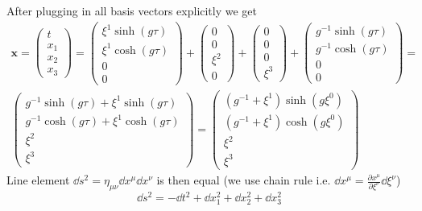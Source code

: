 After plugging in all basis vectors explicitly we get
%
\begin{multline}
	\boldsymbol{x} =
	\begin{pmatrix}
		t   \\
		x_1 \\
		x_2 \\
		x_3
	\end{pmatrix}
	=
	\begin{pmatrix}
		\xi^1 \sinh(g\tau) \\
		\xi^1 \cosh(g\tau) \\
		0                  \\
		0
	\end{pmatrix}+
	\begin{pmatrix}
		0     \\
		0     \\
		\xi^2 \\
		0
	\end{pmatrix}+
	\begin{pmatrix}
		0 \\
		0 \\
		0 \\
		\xi^3
	\end{pmatrix}+
	\begin{pmatrix}
		g^{-1}\sinh(g\tau) \\
		g^{-1}\cosh(g\tau) \\
		0                  \\
		0
	\end{pmatrix}= \\
	\begin{pmatrix}
		g^{-1}\sinh(g\tau) + \xi^1 \sinh(g\tau) \\
		g^{-1}\cosh(g\tau) + \xi^1 \cosh(g\tau) \\
		\xi^2                                   \\
		\xi^3
	\end{pmatrix}
	=
	\begin{pmatrix}
		(g^{-1} + \xi^1) \sinh(g\xi^0) \\
		(g^{-1} + \xi^1) \cosh(g\xi^0) \\
		\xi^2                          \\
		\xi^3
	\end{pmatrix}
	\label{eq:motion}
\end{multline}
%
Line element $\dd s^2 = \eta_{\mu\nu} \dd x^\mu \dd x^\nu$ is then equal (we use
chain rule i.e. $\dd x^\mu = \frac{\partial x^\mu}{\partial \xi^\nu}\dd
	\xi^\nu$)
%
\begin{equation}
	\dd s^2 = - \dd t^2 + \dd x_1^2 + \dd x_2^2 + \dd x_3^2
\end{equation}
